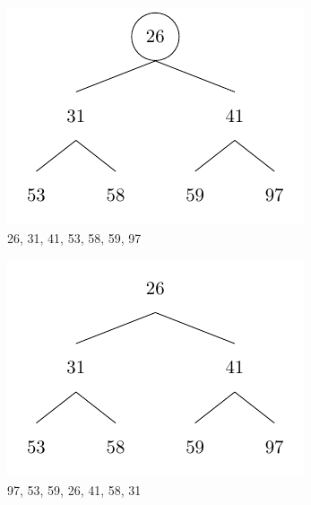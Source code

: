 \begin{center}
\begin{minipage}{0.32\textwidth}
  \begin{figure}[H]
    \centering
    \includegraphics[width=\textwidth]{Figure/HeapSort7.pdf}
    \caption*{26, 31, 41, 53, 58, 59, 97}
  \end{figure}
\end{minipage}
\begin{minipage}{0.32\textwidth}
  \begin{figure}[H]
    \centering
    \includegraphics[width=\textwidth]{Figure/HeapSort8.pdf}
    \caption*{97, 53, 59, 26, 41, 58, 31}
  \end{figure}
\end{minipage}
\end{center}

